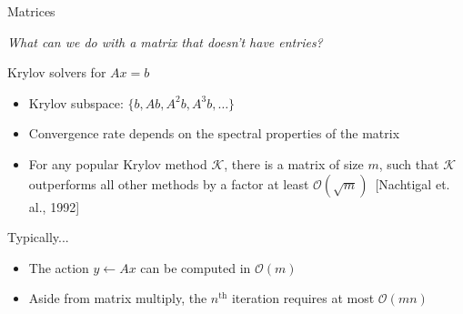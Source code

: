 \begin{frame}{Matrices}

\begin{center}
 \em What can we do with a matrix that doesn't have entries?
\end{center}


  \begin{block}{Krylov solvers for $A x = b$}
    \begin{itemize}
    \item Krylov subspace: $\{b, Ab, A^2b, A^3b, \dotsc\}$
    \item Convergence rate depends on the spectral properties of the matrix
    \item For any popular Krylov method $\mathcal{K}$, there is a matrix
      of size $m$, such that $\mathcal{K}$ outperforms all other methods
      by a factor at least $\mathcal{O}(\sqrt{m})$~[Nachtigal et. al., 1992]%
    \end{itemize}
  \end{block}
  

  \begin{block}{Typically...}
    \begin{itemize}
    \item The action $y \gets A x$ can be computed in $\mathcal{O}(m)$
    \item Aside from matrix multiply, the $n^{\text{th}}$ iteration requires at most $\mathcal{O}(mn)$
    \end{itemize}
  \end{block}
\end{frame}
